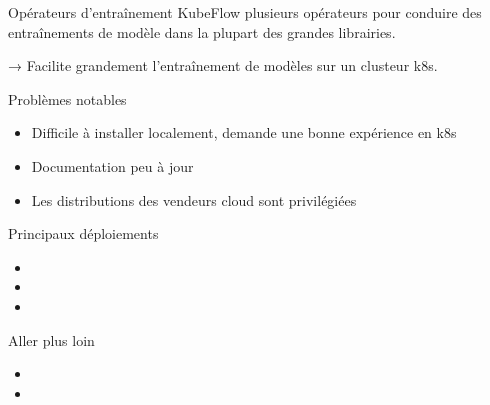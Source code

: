 \begin{frame}{Opérateurs d'entraînement}
  KubeFlow  plusieurs opérateurs pour conduire des entraînements de modèle dans la plupart des grandes librairies.

  → Facilite grandement l'entraînement de modèles sur un clusteur k8s.
\end{frame}

\begin{frame}{Problèmes notables}
  \begin{itemize}
    \item Difficile à installer localement, demande une bonne expérience en k8s
    \item Documentation peu à jour
    \item Les distributions des vendeurs cloud sont privilégiées 
  \end{itemize}
\end{frame}

\begin{frame}{Principaux déploiements}
  \begin{itemize}
    \item {}
    \item {}
    \item {}
  \end{itemize}
\end{frame}

\begin{frame}{Aller plus loin}
  \begin{itemize}
    \item {}
    \item {}
  \end{itemize}
\end{frame}